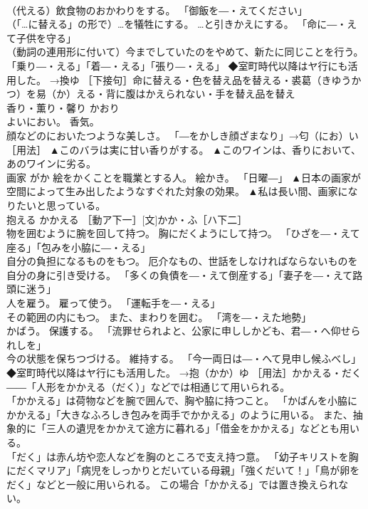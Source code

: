 \documentclass[8pt]{extreport}
\begin{document}
\begin{CJK}{UTF8}{min}
\\	（代える）飲食物のおかわりをする。 「御飯を―・えてください」 
\\	（「…に替える」の形で）…を犠牲にする。 …と引きかえにする。 「命に―・えて子供を守る」 
\\	（動詞の連用形に付いて）今までしていたのをやめて、新たに同じことを行う。 「乗り―・える」「着―・える」「張り―・える」 ◆室町時代以降はヤ行にも活用した。 →換ゆ ［下接句］命に替える・色を替え品を替える・裘葛（きゆうかつ）を易（か）える・背に腹はかえられない・手を替え品を替え	
\\	香り・薫り・馨り	かおり	
\\	よいにおい。 香気。 
\\	顔などのにおいたつような美しさ。 「―をかしき顔ざまなり」→匂（にお）い［用法］	▲このバラは実に甘い香りがする。 ▲このワインは、香りにおいて、あのワインに劣る。
\\	画家	がか	絵をかくことを職業とする人。 絵かき。 「日曜―」	▲日本の画家が空間によって生み出したようなすぐれた対象の効果。 ▲私は長い間、画家になりたいと思っている。
\\	抱える	かかえる	［動ア下一］[文]かか・ふ［ハ下二］ 
\\	物を囲むように腕を回して持つ。 胸にだくようにして持つ。 「ひざを―・えて座る」「包みを小脇に―・える」 
\\	自分の負担になるものをもつ。 厄介なもの、世話をしなければならないものを自分の身に引き受ける。 「多くの負債を―・えて倒産する」「妻子を―・えて路頭に迷う」 
\\	人を雇う。 雇って使う。 「運転手を―・える」 
\\	その範囲の内にもつ。 また、まわりを囲む。 「湾を―・えた地勢」 
\\	かばう。 保護する。 「流罪せられよと、公家に申ししかども、君―・へ仰せられしを」 
\\	今の状態を保ちつづける。 維持する。 「今一両日は―・へて見申し候ふべし」 ◆室町時代以降はヤ行にも活用した。 →抱（かか）ゆ ［用法］かかえる・だく――「人形をかかえる（だく）」などでは相通じて用いられる。 
\\	「かかえる」は荷物などを腕で囲んで、胸や脇に持つこと。 「かばんを小脇にかかえる」「大きなふろしき包みを両手でかかえる」のように用いる。 また、抽象的に「三人の遺児をかかえて途方に暮れる」「借金をかかえる」などとも用いる。 
\\	「だく」は赤ん坊や恋人などを胸のところで支え持つ意。 「幼子キリストを胸にだくマリア」「病児をしっかりとだいている母親」「強くだいて！」「鳥が卵をだく」などと一般に用いられる。 この場合「かかえる」では置き換えられない。 

\end{CJK}
\end{document}
